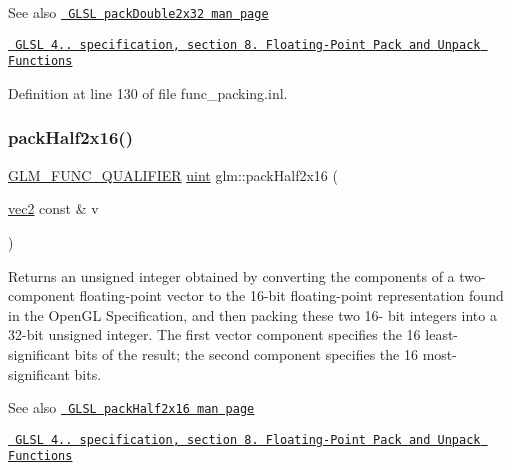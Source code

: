 \begin{DoxySeeAlso}{See also}
\href{http://www.opengl.org/sdk/docs/manglsl/xhtml/packDouble2x32.xml}{\texttt{ G\+L\+SL pack\+Double2x32 man page}} 

\href{http://www.opengl.org/registry/doc/GLSLangSpec.4.20.8.pdf}{\texttt{ G\+L\+SL 4.. specification, section 8. Floating-\/\+Point Pack and Unpack Functions}} 
\end{DoxySeeAlso}


Definition at line 130 of file func\+\_\+packing.\+inl.

\mbox{\label{group__core__func__packing_ga082f6dd65f73a547ed3067ef00be036f}} 
\subsubsection{\texorpdfstring{packHalf2x16()}{packHalf2x16()}}
{\footnotesize\ttfamily \mbox{\hyperlink{setup_8hpp_a33fdea6f91c5f834105f7415e2a64407}{G\+L\+M\+\_\+\+F\+U\+N\+C\+\_\+\+Q\+U\+A\+L\+I\+F\+I\+ER}} \mbox{\hyperlink{group__core__precision_ga4fd29415871152bfb5abd588334147c8}{uint}} glm\+::pack\+Half2x16 (\begin{DoxyParamCaption}\item[{\mbox{\hyperlink{group__core__types_gaa1618f51db67eaa145db101d8c8431d8}{vec2}} const \&}]{v }\end{DoxyParamCaption})}

Returns an unsigned integer obtained by converting the components of a two-\/component floating-\/point vector to the 16-\/bit floating-\/point representation found in the Open\+GL Specification, and then packing these two 16-\/ bit integers into a 32-\/bit unsigned integer. The first vector component specifies the 16 least-\/significant bits of the result; the second component specifies the 16 most-\/significant bits.

\begin{DoxySeeAlso}{See also}
\href{http://www.opengl.org/sdk/docs/manglsl/xhtml/packHalf2x16.xml}{\texttt{ G\+L\+SL pack\+Half2x16 man page}} 

\href{http://www.opengl.org/registry/doc/GLSLangSpec.4.20.8.pdf}{\texttt{ G\+L\+SL 4.. specification, section 8. Floating-\/\+Point Pack and Unpack Functions}} 
\end{DoxySeeAlso}


